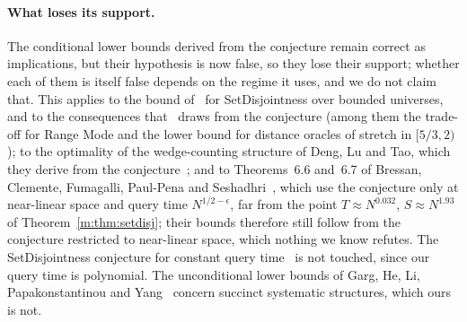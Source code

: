 \documentclass[11pt]{article}
\theoremstyle{definition}
\theoremstyle{remark}
\begin{document}
\paragraph{What loses its support.} The conditional lower bounds derived from the conjecture remain correct as implications, but their hypothesis is now false, so they lose their support; whether each of them is itself false depends on the regime it uses, and we do not claim that. This applies to the bound of~\cite[Theorem~4]{GLP19} for SetDisjointness over bounded universes, and to the consequences that~\cite{GLP19} draws from the conjecture (among them the trade-off for Range Mode and the lower bound for distance oracles of stretch in $[5/3,2)$); to the optimality of the wedge-counting structure of Deng, Lu and Tao, which they derive from the conjecture~\cite[Theorem~1.2]{DLT23}; and to Theorems~6.6 and~6.7 of Bressan, Clemente, Fumagalli, Paul-Pena and Seshadhri~\cite{BCFPS26}, which use the conjecture only at near-linear space and query time $N^{1/2-\epsilon}$, far from the point $T\approx N^{0.032}$, $S\approx N^{1.93}$ of Theorem~\ref{m:thm:setdisj}; their bounds therefore still follow from the conjecture restricted to near-linear space, which nothing we know refutes. The SetDisjointness conjecture for constant query time~\cite[Conjecture~1]{GKLP17} is not touched, since our query time is polynomial. The unconditional lower bounds of Garg, He, Li, Papakonstantinou and Yang~\cite{GHLPY26} concern succinct systematic structures, which ours is not. %
\end{document}
